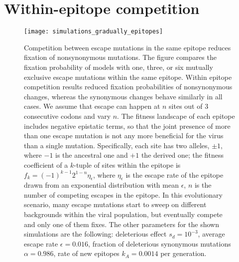 \newpage
\section{Within-epitope competition}
\begin{figure}[h]
\begin{center}
\texttt{[image: simulations\_gradually\_epitopes]}
\caption{
Competition between escape mutations in the same epitope reduces fixation of
nonsynonymous mutations. The figure compares the fixation probability of models
with one, three, or six mutually exclusive escape mutations within the
same epitope. Within epitope competition results reduced fixation
probabilities of nonsynonymous changes, whereas the synonymous changes behave 
similarly in all cases. We assume that escape can happen at $n$ sites out of 3
consecutive codons and vary $n$.
The fitness landscape of each epitope includes negative epistatic terms, so that
the joint presence of more than one escape mutation is not any more beneficial
for the virus than a single mutation. Specifically, each site has two alleles,
$\pm 1$, where $-1$ is the ancestral one and $+1$ the derived one; the fitness
coefficient of a $k$-tuple of sites within the epitope is $f_k = (-1)^{k-1}
2^{1-n}\eta_\epsilon $, where $\eta_\epsilon$ is the escape rate of the epitope
drawn from an exponential distribution with mean $\epsilon$, 
$n$ is the number of competing escapes in the epitope. 
In this evolutionary scenario, many escape mutations start to sweep on different backgrounds within the viral population, but eventually
compete and only one of them fixes. The other parameters for the shown simulations are
the following: deleterious effect $s_d = 10^{-3}$, average escape rate $\epsilon = 0.016$,
fraction of deleterious synonymous mutations $\alpha = 0.986$, rate of new epitopes
$k_A=0.0014$ per generation.
}
\label{fig:wec}
\end{center}
\end{figure}
